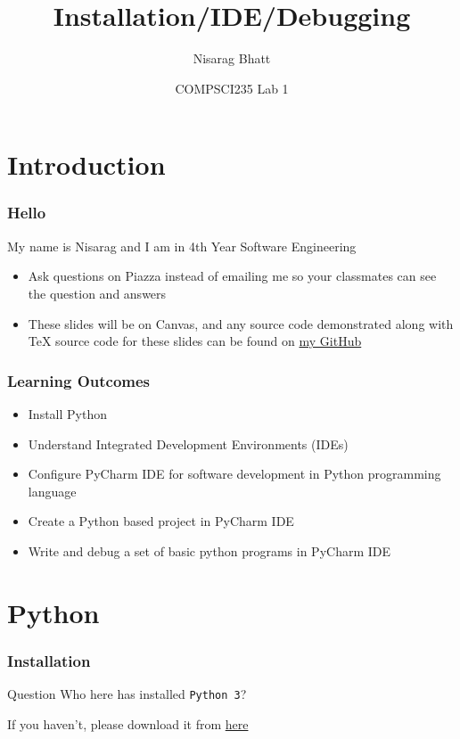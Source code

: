 \documentclass{beamer}
\title[COMPSCI 235 Lab 1 (2020)]
{Installation/IDE/Debugging}
\author{Nisarag Bhatt}
\date[July 2020] 
{COMPSCI235 Lab 1}
\begin{document}
\frame{\titlepage}
\section{Introduction}
\begin{frame}
  \frametitle{Hello}
  My name is Nisarag and I am in 4th Year Software Engineering 
  \begin{itemize}
    \item Ask questions on Piazza instead of emailing me so your classmates can see the question and answers 
    \item These slides will be on Canvas, and any source code demonstrated along with TeX source code for these slides can be found on \href{https://github.com/FocalChord}{my GitHub}
  \end{itemize}
\end{frame}
\begin{frame}
  \frametitle{Learning Outcomes}
  \begin{itemize}
  	\item Install Python
    \item Understand Integrated Development Environments (IDEs)
    \item Configure PyCharm IDE for software development in Python programming language
    \item Create a Python based project in PyCharm IDE
    \item Write and debug a set of basic python programs in PyCharm IDE
  \end{itemize}
\end{frame}
\section{Python}
\begin{frame}
  \frametitle{Installation}
  \begin{block}{Question}
  	Who here has installed \texttt{Python 3}?    
  \end{block}
  \pause
  If you haven't, please download it from \href{https://www.python.org/downloads/}{here} 
\end{frame}
\end{document}

